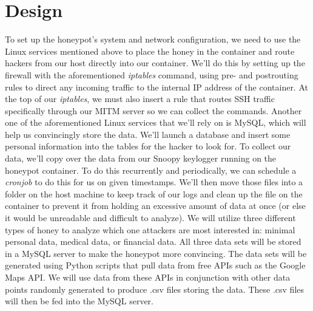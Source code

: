 \documentclass[12pt]{article}
\begin{document}
\section*{\normalsize{Design}}
\indent To set up the honeypot’s system and network configuration, we need to use the Linux services mentioned above to place the honey in the container and route hackers from our host directly into our container. We’ll do this by setting up the firewall with the aforementioned \textit{iptables} command, using pre- and postrouting rules to direct any incoming traffic to the internal IP address of the container. At the top of our \textit{iptables}, we must also insert a rule that routes SSH traffic specifically through our MITM server so we can collect the commands. \newline
\indent Another one of the aforementioned Linux services that we’ll rely on is MySQL, which will help us convincingly store the data. We’ll launch a database and insert some personal information into the tables for the hacker to look for. \newline
\indent To collect our data, we’ll copy over the data from our Snoopy keylogger running on the honeypot container. To do this recurrently and periodically, we can schedule a \textit{cronjob} to do this for us on given timestamps. We’ll then move those files into a folder on the host machine to keep track of our logs and clean up the file on the container to prevent it from holding an excessive amount of data at once (or else it would be unreadable and difficult to analyze). \newline
\indent We will utilize three different types of honey to analyze which one attackers are most interested in: minimal personal data, medical data, or financial data. All three data sets will be stored in a MySQL server to make the honeypot more convincing. The data sets will be generated using Python scripts that pull data from free APIs such as the Google Maps API. We will use data from these APIs in conjunction with other data points randomly generated to produce .csv files storing the data. These .csv files will then be fed into the MySQL server.
\end{document}
